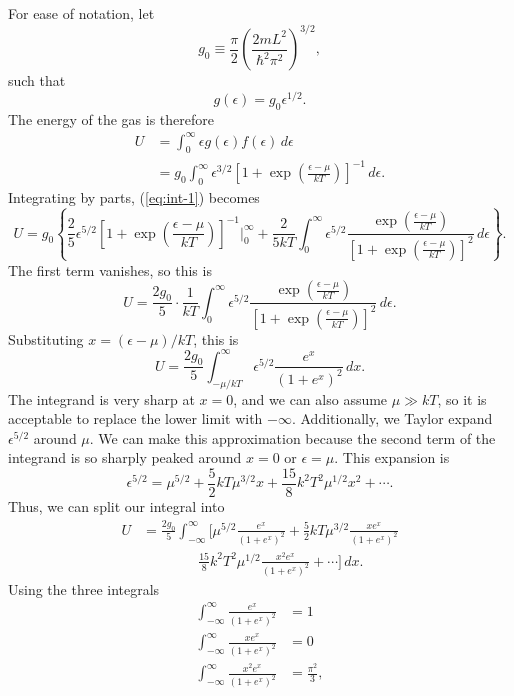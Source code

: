 \documentclass[12pt]{article}
\begin{document}
For ease of notation, let 
\[
	g_0 \equiv \frac{\pi}{2} \left( \frac{2mL^2}{\hbar^2 \pi^2} \right)^{3/2},
\]
such that
\[
	g(\epsilon) = g_0 \epsilon^{1/2}.
\]
The energy of the gas is therefore 
\begin{align}
	U &= \int_{0}^{\infty}\epsilon g(\epsilon) f(\epsilon) \,\textit{d}\epsilon \\
	  &= g_0 \int_0^{\infty} \epsilon^{3/2} \left[ 1+\exp\left( \frac{\epsilon - \mu}{kT} \right) \right]^{-1} \,\textit{d}\epsilon. \label{eq:int-1}
\end{align}
Integrating by parts, (\ref{eq:int-1}) becomes 
\begin{equation*}
	U = g_0 \left\{ \frac{2}{5}\epsilon^{5/2} \left[ 1+\exp\left( \frac{\epsilon - \mu}{kT} \right) \right]^{-1} \Bigg|_0^{\infty} + \frac{2}{5kT}\int_0^{\infty} \epsilon^{5/2} \frac{\exp\left( \frac{\epsilon - \mu}{kT} \right)}{\left[ 1+\exp\left( \frac{\epsilon - \mu}{kT} \right) \right]^{2}} \,\textit{d}\epsilon \right\}.
\end{equation*}
The first term vanishes, so this is 
\[
	U = \frac{2g_0}{5}\cdot \frac{1}{kT} \int_0^{\infty}  \epsilon^{5/2} \frac{\exp\left( \frac{\epsilon - \mu}{kT} \right)}{\left[ 1+\exp\left( \frac{\epsilon - \mu}{kT} \right) \right]^{2}} \,\textit{d}\epsilon. 
\]
Substituting $x = (\epsilon - \mu)/kT$, this is 
\[
	U = \frac{2g_0}{5} \int_{-\mu/kT}^{\infty} \epsilon^{5/2} \frac{e^x}{(1+e^x)^2} \,\textit{d}x.
\]
The integrand is very sharp at $x = 0$, and we can also assume $\mu \gg kT$, so it is acceptable to replace the lower limit with $-\infty$.  Additionally, we Taylor expand $\epsilon^{5/2}$ around $\mu$.  We can make this approximation because the second term of the integrand is so sharply peaked around $x = 0$ or $\epsilon = \mu$.  This expansion is
\begin{equation}
	\epsilon^{5/2} = \mu^{5/2} + \frac{5}{2}kT\mu^{3/2}x + \frac{15}{8}k^2 T^2 \mu^{1/2} x^2 + \cdots.
\end{equation}
Thus, we can split our integral into 
\begin{align}
	U &= \frac{2g_0}{5}\int_{-\infty}^{\infty} \Bigg [ \mu^{5/2}\frac{e^x}{(1+e^x)^2}  + \frac{5}{2}kT\mu^{3/2} \frac{xe^x}{(1+e^x)^2} \nonumber \\
	  &\qquad \qquad \frac{15}{8} k^2 T^2 \mu^{1/2} \frac{x^2 e^x}{(1+e^x)^2} + \cdots \Bigg ] \,\textit{d}x. 
\end{align}
Using the three integrals
\begin{align*}
	\int_{-\infty}^{\infty} \frac{e^x}{(1+e^x)^2} &= 1 \\
	\int_{-\infty}^{\infty} \frac{xe^x}{(1+e^x)^2} &= 0 \\
	\int_{-\infty}^{\infty} \frac{x^2e^x}{(1+e^x)^2} &= \frac{\pi^2}{3},
\end{align*}
\end{document}
